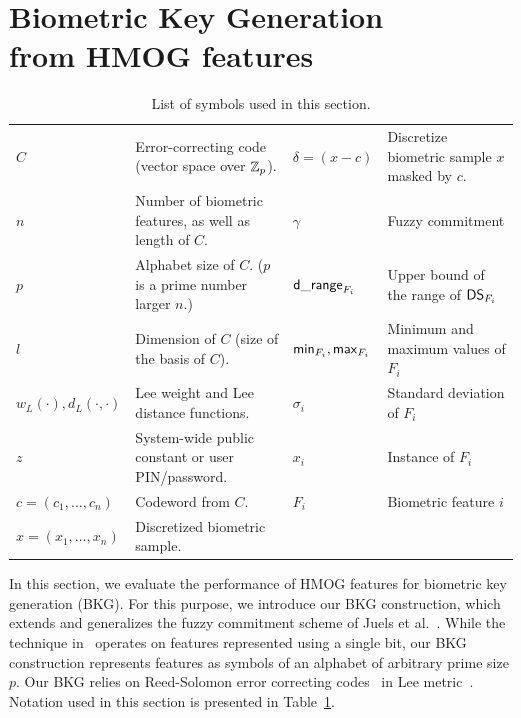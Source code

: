 %
\section{Biometric Key Generation \\from HMOG features}
\label{sec:bkg}

%
\begin{table}[t]
\caption{List of symbols used in this section.}
\begin{tabular}{|l|l||l|l|}
\hline
$C$ 							& Error-correcting code (vector space over $\mathbb{Z}_p$). & $\delta = (x-c)$					& Discretize biometric sample $x$ masked by $c$. \\

%
$n$ 							& Number of biometric features, as well as length of $C$. & $\gamma$					& Fuzzy commitment \\
$p$ 							& Alphabet size of $C$. ($p$ is a prime number larger $n$.)  & ${\sf d\_range}_{{F}_i}$			& Upper bound of the range of ${\sf DS}_{{F}_i}$ \\
%
$l$							& Dimension of $C$ (size of the basis of $C$).  & ${\sf min}_{{F}_i}, {\sf max}_{{F}_i}$ & Minimum and maximum values of $F_i$	 \\ 
$w_L(\cdot), d_L(\cdot,\cdot)$			& Lee weight and Lee distance functions. & $\sigma_i$				& Standard deviation of $F_i$ \\
%
$z$							& System-wide public constant or user PIN/password. & $x_i$  		& Instance of $F_i$ \\ 
%
$c = (c_1, \ldots, c_n)$			& Codeword from $C$. & ${F}_i$		& Biometric feature $i$\\
$x = (x_1, \ldots, x_n)$			& Discretized biometric sample. & & \\




%


%


\hline
\end{tabular}
\label{tbl:bkg-symbols}
\end{table}
%

In this section, we evaluate the performance of HMOG features for biometric key 
generation (BKG). For this purpose, we introduce our BKG construction, which 
extends and generalizes the fuzzy commitment scheme of Juels et 
al.~\cite{fuzzy_commitment}. While the technique in~\cite{fuzzy_commitment} operates on features represented using a single bit, our BKG construction represents features as symbols of an alphabet of arbitrary prime size $p$. Our BKG relies on Reed-Solomon error correcting codes~\cite{rot06} in Lee metric~\cite{lee58}. Notation used in this section is presented in Table~\ref{tbl:bkg-symbols}.


